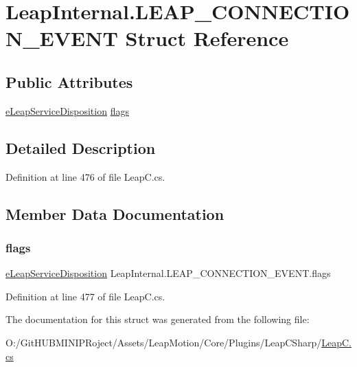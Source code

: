 \hypertarget{struct_leap_internal_1_1_l_e_a_p___c_o_n_n_e_c_t_i_o_n___e_v_e_n_t}{}\section{Leap\+Internal.\+L\+E\+A\+P\+\_\+\+C\+O\+N\+N\+E\+C\+T\+I\+O\+N\+\_\+\+E\+V\+E\+NT Struct Reference}
\label{struct_leap_internal_1_1_l_e_a_p___c_o_n_n_e_c_t_i_o_n___e_v_e_n_t}
\subsection*{Public Attributes}
\begin{DoxyCompactItemize}
\item 
\mbox{\hyperlink{namespace_leap_internal_ab2f23b85c583724a090dca2c20793d85}{e\+Leap\+Service\+Disposition}} \mbox{\hyperlink{struct_leap_internal_1_1_l_e_a_p___c_o_n_n_e_c_t_i_o_n___e_v_e_n_t_a560557577d9b56cd15a9ff194c775374}{flags}}
\end{DoxyCompactItemize}


\subsection{Detailed Description}


Definition at line 476 of file Leap\+C.\+cs.



\subsection{Member Data Documentation}
\mbox{\label{struct_leap_internal_1_1_l_e_a_p___c_o_n_n_e_c_t_i_o_n___e_v_e_n_t_a560557577d9b56cd15a9ff194c775374}} 
\subsubsection{\texorpdfstring{flags}{flags}}
{\footnotesize\ttfamily \mbox{\hyperlink{namespace_leap_internal_ab2f23b85c583724a090dca2c20793d85}{e\+Leap\+Service\+Disposition}} Leap\+Internal.\+L\+E\+A\+P\+\_\+\+C\+O\+N\+N\+E\+C\+T\+I\+O\+N\+\_\+\+E\+V\+E\+N\+T.\+flags}



Definition at line 477 of file Leap\+C.\+cs.



The documentation for this struct was generated from the following file\+:\begin{DoxyCompactItemize}
\item 
O\+:/\+Git\+H\+U\+B\+M\+I\+N\+I\+P\+Roject/\+Assets/\+Leap\+Motion/\+Core/\+Plugins/\+Leap\+C\+Sharp/\mbox{\hyperlink{_leap_c_8cs}{Leap\+C.\+cs}}\end{DoxyCompactItemize}
